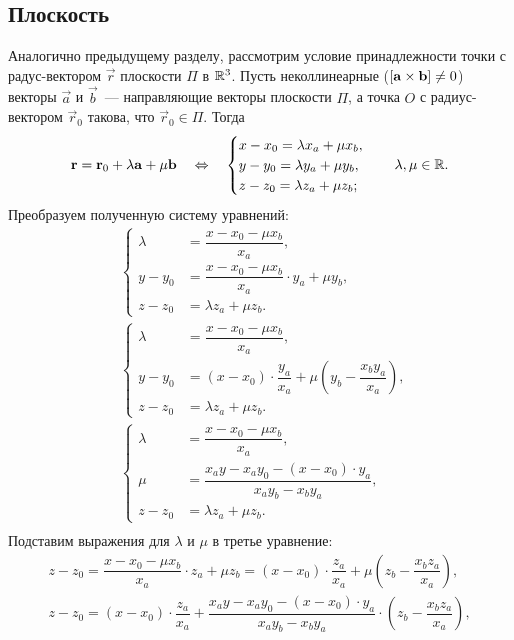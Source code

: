 \subsection{Плоскость}

Аналогично предыдущему разделу, рассмотрим условие принадлежности точки с радус-вектором $\vec{r}$ плоскости $\Pi$ в $\mathbb{R}^3$. Пусть неколлинеарные ($ \left[\mathbf{a} \times \mathbf{b}\right] \not = 0$) векторы  $\vec{a}$ и $\vec{b}$~--- направляющие векторы плоскости $\Pi$, а точка $O$ с радиус-вектором $\vec r_0$ такова, что $\vec{r}_0 \in \Pi$. Тогда
\begin{equation}
	\mathbf{r} = \mathbf{r}_0 + \lambda\mathbf{a} + \mu\mathbf{b} \quad \Leftrightarrow \quad \begin{cases}
	x - x_0 = \lambda x_a + \mu x_b,\\
	y - y_0 = \lambda y_a + \mu y_b,\\
	z - z_0 = \lambda z_a + \mu z_b;
\end{cases}\quad \lambda, \mu \in \mathbb{R}.
\end{equation}
Преобразуем полученную систему уравнений:
\begin{align*}
& \left\{
\begin{aligned}
	\lambda &= \dfrac{x - x_0 - \mu x_b}{x_a},\\
	y - y_0 &= \dfrac{x - x_0 - \mu x_b}{x_a} \cdot y_a + \mu y_b,\\
	z - z_0 &= \lambda z_a + \mu z_b.
\end{aligned}\right.\\
& \left\{
\begin{aligned}
	\lambda &= \dfrac{x - x_0 - \mu x_b}{x_a},\\
	y - y_0 &= (x - x_0) \cdot \dfrac{y_a}{x_a} + \mu \left(y_b - \dfrac{x_b y_a}{x_a} \right),\\
	z - z_0 &= \lambda z_a + \mu z_b.
\end{aligned}\right.\\
&\left\{
\begin{aligned}
	\lambda &= \dfrac{x - x_0 - \mu x_b}{x_a},\\
	\mu &= \dfrac{x_a y - x_a y_0 - (x - x_0) \cdot y_a}{x_a y_b - x_b y_a},\\
	z - z_0 &= \lambda z_a + \mu z_b.
\end{aligned}\right.\\
\end{align*}
Подставим выражения для $\lambda$ и $\mu$ в третье уравнение:
\begin{gather*}
z - z_0 = \dfrac{x - x_0 - \mu x_b}{x_a} \cdot z_a + \mu z_b = (x - x_0) \cdot \dfrac{z_a}{x_a} + \mu \left( z_b - \dfrac{x_b z_a}{x_a} \right),\\
z - z_0 = (x - x_0) \cdot \dfrac{z_a}{x_a} + \dfrac{x_a y - x_a y_0 - (x - x_0) \cdot y_a}{x_a y_b - x_b y_a} \cdot \left( z_b - \dfrac{x_b z_a}{x_a} \right),
\end{gather*}
